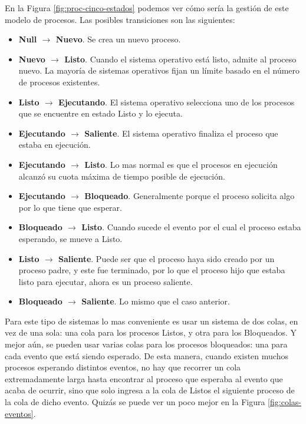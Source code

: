\documentclass[12pt]{article}
\begin{document}
  En la Figura \ref{fig:proc-cinco-estados} podemos ver cómo sería la gestión de este modelo de procesos. Las posibles transiciones son las siguientes:
  \begin{itemize}
    \item \textbf{Null $  \to  $ Nuevo}. Se crea un nuevo proceso.

    \item \textbf{Nuevo $  \to  $ Listo}. Cuando el sistema operativo está listo, admite al proceso nuevo. La mayoría de sistemas operativos fijan un límite basado en el número de procesos existentes.

    \item \textbf{Listo $  \to  $ Ejecutando}. El sistema operativo selecciona uno de los procesos que se encuentre en estado Listo y lo ejecuta.

    \item \textbf{Ejecutando $  \to  $ Saliente}. El sistema operativo finaliza el proceso que estaba en ejecución.

    \item \textbf{Ejecutando $  \to  $ Listo}. Lo mas normal es que el procesos en ejecución alcanzó su cuota máxima de tiempo posible de ejecución. 

    \item \textbf{Ejecutando $  \to  $ Bloqueado}. Generalmente porque el proceso solicita algo por lo que tiene que esperar.

    \item \textbf{Bloqueado $  \to  $ Listo}. Cuando sucede el evento por el cual el proceso estaba esperando, se mueve a Listo.

    \item \textbf{Listo $  \to  $ Saliente}. Puede ser que el proceso haya sido creado por un proceso padre, y este fue terminado, por lo que el proceso hijo que estaba listo para ejecutar, ahora es un proceso saliente.

    \item \textbf{Bloqueado $  \to  $ Saliente}. Lo mismo que el caso anterior.
  \end{itemize}

  Para este tipo de sistemas lo mas conveniente es usar un sistema de dos colas, en vez de una sola: una cola para los procesos Listos, y otra para los Bloqueados. Y mejor aún, se pueden usar varias colas para los procesos bloqueados: una para cada evento que está siendo esperado. De esta manera, cuando existen muchos procesos esperando distintos eventos, no hay que recorrer un cola extremadamente larga hasta encontrar al proceso que esperaba al evento que acaba de ocurrir, sino que solo ingresa a la cola de Listos el siguiente proceso de la cola de dicho evento. Quizás se puede ver un poco mejor en la Figura \ref{fig:colas-eventos}.
\end{document}
